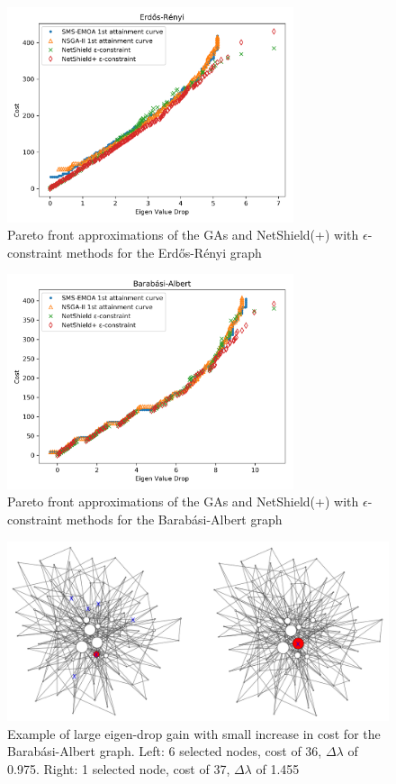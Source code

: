 \documentclass[11pt]{article}
\theoremstyle{definition}
\begin{document}
\begin{figure}[h!]
  \centering
    \includegraphics[width=0.75\textwidth]{results_ns_ga/Erdos_Renyi_V100_attaintment_netshield}
  \caption{Pareto front approximations of the GAs and NetShield(+) with $\epsilon$-constraint methods for the Erd\H{o}s-R\'enyi graph}
  \label{fig:erdos_renyi_atns}
\end{figure}

\begin{figure}[h!]
  \centering
    \includegraphics[width=0.75\textwidth]{results_ns_ga/Barabasi_Albert_V100_attaintment_netshield}
  \caption{Pareto front approximations of the GAs and NetShield(+) with $\epsilon$-constraint methods for the Barab\'asi-Albert graph}
  \label{fig:baral_atns}
\end{figure}

\begin{figure}[h!]
  \centering
    \includegraphics[width=1\textwidth]{other_img/j1}
  \caption{Example of large eigen-drop gain with small increase in cost for the Barab\'asi-Albert graph. 
    Left: 6 selected nodes, cost of 36, $\Delta\lambda$ of 0.975. 
    Right: 1 selected node, cost of 37, $\Delta\lambda$ of 1.455}
  \label{fig:j1}
\end{figure}
\end{document}
